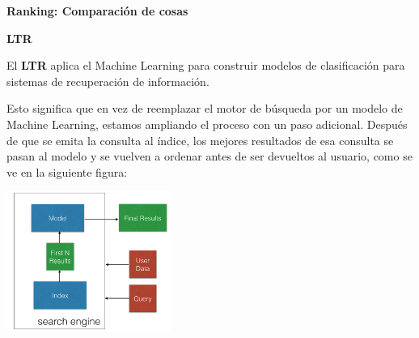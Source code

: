 \documentclass[11pt]{beamer}
\begin{document}
\begin{frame}{\textbf{\textcolor{green!55!blue}{Ranking: Comparaci\'on de cosas}}}
	
\textbf{LTR}

\scriptsize{
	
El \textbf{LTR} aplica el Machine Learning para construir modelos de clasificaci\'on para sistemas de recuperaci\'on de informaci\'on.


Esto significa que en vez de reemplazar el motor de b\'usqueda por un modelo de Machine Learning, estamos ampliando el proceso con un paso adicional. Despu\'es de que se emita la consulta al \'indice, los mejores resultados de esa consulta se pasan al modelo y se vuelven a ordenar antes de ser devueltos al usuario, como se ve en la siguiente figura:

\begin{center}
	\includegraphics[width=0.4\textwidth]{ML11.png}	
\end{center}
}	
	
\end{frame}
\end{document}
